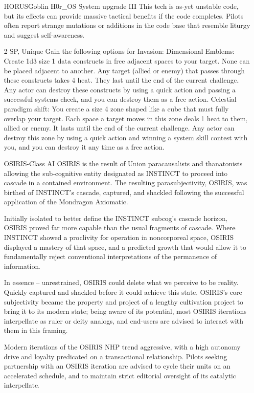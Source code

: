 \begin{mech}{HORUS}{Goblin}
H0r\_OS System upgrade III
This tech is as-yet unstable code, but its effects can provide massive tactical benefits if the code completes. Pilots often report strange mutations or additions in the code base that resemble liturgy and suggest self-awareness.

2 SP, Unique
Gain the following options for Invasion:
Dimensional Emblems: Create 1d3 size 1 data constructs in free adjacent spaces to your target. None can be placed adjacent to another. Any target (allied or enemy) that passes through these constructs takes 4 heat. They last until the end of the current challenge. Any actor can destroy these constructs by using a quick action and passing a successful systems check, and you can destroy them as a free action.
Celestial paradigm shift: You create a size 4 zone shaped like a cube that must fully overlap your target. Each space a target moves in this zone deals 1 heat to them, allied or enemy. It lasts until the end of the current challenge. Any actor can destroy this zone by using a quick action and winning a system skill contest with you, and you can destroy it any time as a free action.

OSIRIS-Class AI
OSIRIS is the result of Union paracausalists and thanatonists allowing the sub-cognitive entity designated as INSTINCT to proceed into cascade in a contained environment. The resulting parasubjectivity, OSIRIS, was birthed of INSTINCT’s cascade, captured, and shackled following the successful application of the Mondragon Axiomatic.

Initially isolated to better define the INSTINCT subcog’s cascade horizon, OSIRIS proved far more capable than the usual fragments of cascade. Where INSTINCT showed a proclivity for operation in noncorporeal space, OSIRIS displayed a mastery of that space, and a predicted growth that would allow it to fundamentally reject conventional interpretations of the permanence of information.

In essence -- unrestrained, OSIRIS could delete what we perceive to be reality. Quickly captured and shackled before it could achieve this state, OSIRIS’s core subjectivity became the property and project of a lengthy cultivation project to bring it to its modern state; being aware of its potential, most OSIRIS iterations interpellate as ruler or deity analogs, and end-users are advised to interact with them in this framing.

Modern iterations of the OSIRIS NHP trend aggressive, with a high autonomy drive and loyalty predicated on a transactional relationship. Pilots seeking partnership with an OSIRIS iteration are advised to cycle their units on an accelerated schedule, and to maintain strict editorial oversight of its catalytic interpellate.


\end{mech}
